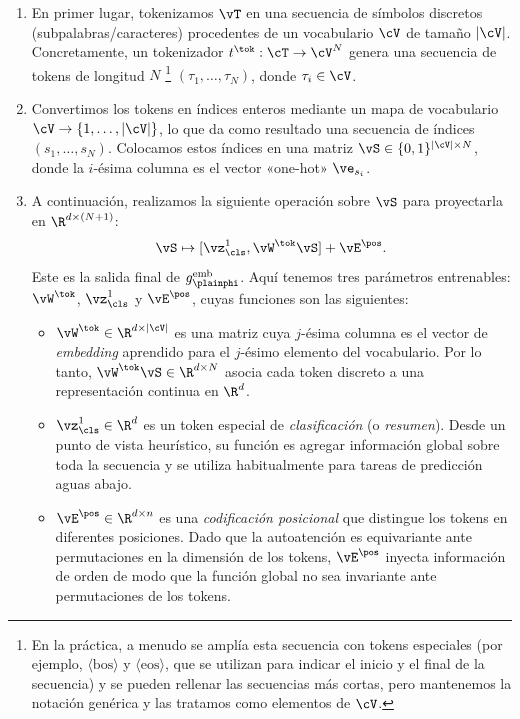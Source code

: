\documentclass[../../book-main_es.tex]{subfiles}
\begin{document}
\begin{enumerate}
    \item En primer lugar, tokenizamos \(\vT\) en una secuencia de símbolos discretos
        (subpalabras/caracteres) procedentes de un vocabulario \(\cV\) de
        tamaño \(|\cV|\). Concretamente, un tokenizador
        \(t^{\tok} : \cT \to \cV^{N}\) genera una secuencia de tokens de longitud \(N\)
        \footnote{En la práctica, a menudo se amplía esta
        secuencia con tokens especiales (por ejemplo, \(\langle \text{bos}\rangle\) y
        \(\langle \text{eos}\rangle\), que se utilizan para indicar el inicio y el final 
        de la secuencia) y se pueden rellenar las secuencias más cortas, pero mantenemos la notación
        genérica y las tratamos como elementos de \(\cV\).} \((\tau_{1},\dots,\tau_{N})\), donde
        \(\tau_i \in \cV\).
    \item Convertimos los tokens en índices enteros mediante un mapa de vocabulario
        \(\cV\to\{1,\dots,|\cV|\}\), lo que da como resultado una secuencia de índices
        \((s_{1},\dots,s_{N})\). Colocamos estos índices en
        una matriz \(\vS \in \{0,1\}^{|\cV|\times N}\), donde la
        \(i\)-ésima columna es el vector «one-hot» \(\ve_{s_i}\).
    \item A continuación, realizamos la siguiente operación sobre \(\vS\) para proyectarla en \(\R^{d \times (N+1)}\):
        \begin{equation}
            \vS \mapsto [\vz_{\cls}^{1}, \vW^{\tok}\vS] + \vE^{\pos}.
        \end{equation}
        Este es la salida final de \(g_{\plainphi}^{\text{emb}}\). Aquí tenemos tres parámetros entrenables: \(\vW^{\tok}\),
        \(\vz_{\cls}^{1}\) y \(\vE^{\pos}\), cuyas funciones son las siguientes:
        \begin{itemize}
            \item \(\vW^{\tok} \in \R^{d \times |\cV|}\) es una matriz
                cuya \(j\)-ésima columna es el vector de \textit{embedding} aprendido
                para el \(j\)-ésimo elemento del vocabulario. Por lo tanto, \(\vW^{\tok}\vS
                \in \R^{d\times N}\) asocia cada token discreto a una
                representación continua en \(\R^{d}\).
            \item \(\vz_{\cls}^{1} \in \R^{d}\) es un token especial
                de \textit{clasificación} (o \textit{resumen}).
                Desde un punto de vista heurístico, su función es agregar información global
                sobre toda la secuencia y se utiliza habitualmente
                para tareas de predicción aguas abajo.
            \item \(\vE^{\pos} \in \R^{d \times n}\) es una
                \textit{codificación posicional} que distingue
                los tokens en diferentes posiciones. Dado que la autoatención
                es equivariante ante permutaciones en la dimensión de los tokens,
                \(\vE^{\pos}\) inyecta información de orden de modo que la
                función global no sea invariante ante permutaciones de los
                tokens.
        \end{itemize}
\end{enumerate}
\end{document}
